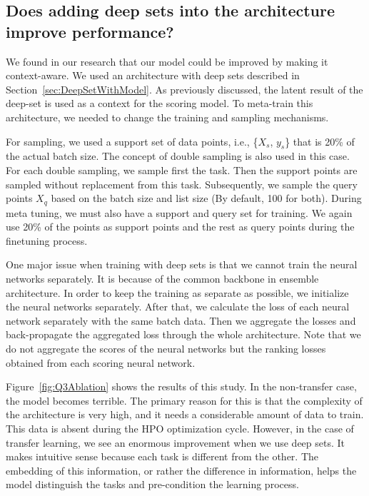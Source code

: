 \documentclass[12pt, twoside, ngerman]{report}
\begin{document}
\subsection{Does adding deep sets into the architecture improve performance?}

We found in our research that our model could be improved by making it context-aware. We used an architecture with deep sets described in Section~\ref{sec:DeepSetWithModel}. As previously discussed, the latent result of the deep-set is used as a context for the scoring model. To meta-train this architecture,  we needed to change the training and sampling mechanisms.

For sampling, we used a support set of data points, i.e., \{$X_s$, $y_s$\} that is 20\% of the actual batch size. The concept of double sampling is also used in this case. For each double sampling, we sample first the task.
Then the support points are sampled without replacement from this task.
Subsequently, we sample the query points $X_q$ based on the batch size and list size (By default, 100 for both).
During meta tuning, we must also have a support and query set for training.
We again use 20\% of the points as support points and the rest as query points during the finetuning process.

One major issue when training with deep sets is that we cannot train the neural networks separately.
It is because of the common backbone in ensemble architecture.
In order to keep the training as separate as possible, we initialize the neural networks separately. After that, we calculate the loss of each neural network separately with the same batch data. Then we aggregate the losses and back-propagate the aggregated loss through the whole architecture. Note that we do not aggregate the scores of the neural networks but the ranking losses obtained from each scoring neural network.

Figure~\ref{fig:Q3Ablation} shows the results of this study. In the non-transfer case,  the model becomes terrible. The primary reason for this is that the complexity of the architecture is very high, and it needs a considerable amount of data to train. This data is absent during the HPO optimization cycle. However,  in the case of transfer learning,  we see an enormous improvement when we use deep sets. It makes intuitive sense because each task is different from the other. The embedding of this information, or rather the difference in information, helps the model distinguish the tasks and pre-condition the learning process. 
\end{document}
